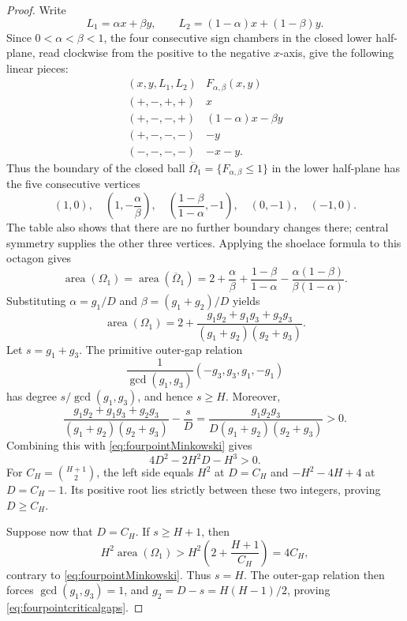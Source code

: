\documentclass[11pt,reqno]{amsart}
\theoremstyle{definition}
\theoremstyle{remark}
\begin{document}
\begin{proof}
Write
\[
 L_1=\alpha x+\beta y,
 \qquad
 L_2=(1-\alpha)x+(1-\beta)y.
\]
Since $0<\alpha<\beta<1$, the four consecutive sign chambers in the
closed lower half-plane, read clockwise from the positive to the
negative $x$-axis, give the following linear pieces:
\[
\begin{array}{c|c}
 (x,y,L_1,L_2) & F_{\alpha,\beta}(x,y)\\ \hline
 (+,-,+,+) & x\\
 (+,-,-,+) & (1-\alpha)x-\beta y\\
 (+,-,-,-) & -y\\
 (-,-,-,-) & -x-y.
\end{array}
\]
Thus the boundary of the closed ball
$\overline\Omega_1=\{F_{\alpha,\beta}\leq1\}$ in the lower half-plane has
the five consecutive vertices
\[
 (1,0),\quad
 \left(1,-\frac{\alpha}{\beta}\right),\quad
 \left(\frac{1-\beta}{1-\alpha},-1\right),\quad
 (0,-1),\quad
 (-1,0).
\]
The table also shows that there are no further boundary changes there;
central symmetry supplies the other three vertices.  Applying the shoelace
formula to this octagon gives
\[
 \operatorname{area}(\Omega_1)
 =\operatorname{area}(\overline\Omega_1)
 =2+\frac{\alpha}{\beta}
   +\frac{1-\beta}{1-\alpha}
   -\frac{\alpha(1-\beta)}{\beta(1-\alpha)}.
\]
Substituting $\alpha=g_1/D$ and $\beta=(g_1+g_2)/D$ yields
\begin{equation}\label{eq:fourpointrelationballarea}
 \operatorname{area}(\Omega_1)
 =2+\frac{g_1g_2+g_1g_3+g_2g_3}
          {(g_1+g_2)(g_2+g_3)}.
\end{equation}
Let $s=g_1+g_3$.  The primitive outer-gap relation
\[
 \frac1{\gcd(g_1,g_3)}(-g_3,g_3,g_1,-g_1)
\]
has degree $s/\gcd(g_1,g_3)$, and hence $s\geq H$.  Moreover,
\[
 \frac{g_1g_2+g_1g_3+g_2g_3}
      {(g_1+g_2)(g_2+g_3)}
 -\frac{s}{D}
 =
 \frac{g_1g_2g_3}
 {D(g_1+g_2)(g_2+g_3)}>0.
\]
Combining this with \eqref{eq:fourpointMinkowski} gives
\[
 4D^2-2H^2D-H^3>0.
\]
For $C_H=\binom{H+1}{2}$, the left side equals $H^2$ at $D=C_H$
and $-H^2-4H+4$ at $D=C_H-1$.  Its positive root lies strictly
between these two integers, proving $D\geq C_H$.

Suppose now that $D=C_H$.  If $s\geq H+1$, then
\[
 H^2\operatorname{area}(\Omega_1)
 >
 H^2\left(2+\frac{H+1}{C_H}\right)
 =4C_H,
\]
contrary to \eqref{eq:fourpointMinkowski}.  Thus $s=H$.  The
outer-gap relation then forces $\gcd(g_1,g_3)=1$, and
$g_2=D-s=H(H-1)/2$, proving \eqref{eq:fourpointcriticalgaps}.
\end{proof}
\end{document}
